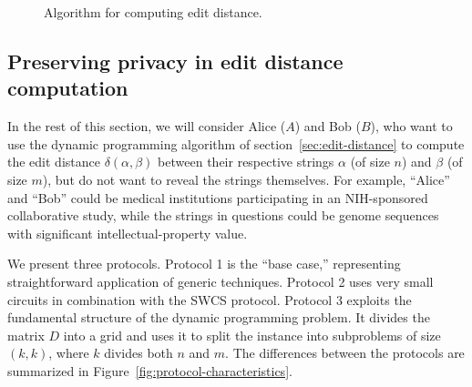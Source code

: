 \begin{figure}
\caption{Algorithm for computing edit distance.}
\label{fig:edit-distance-alg}
\end{figure}


\subsection{Preserving privacy in edit distance computation}

In the rest of this section, we will consider Alice ($A$) and
Bob ($B$), who want to use the dynamic programming algorithm
of section~\ref{sec:edit-distance} to compute the edit distance
$\delta(\alpha,\beta)$ between their respective strings $\alpha$
(of size $n$) and $\beta$ (of size $m$), but do not want to reveal
the strings themselves.  For example, ``Alice'' and ``Bob'' could be
medical institutions participating in an NIH-sponsored collaborative
study, while the strings in questions could be genome sequences with
significant intellectual-property value.

We present three protocols.  Protocol 1 is the ``base case,'' representing
straightforward application of generic techniques.  Protocol 2 uses
very small circuits in combination with the SWCS protocol.  Protocol 3
exploits the fundamental structure of the dynamic programming problem.
It divides the matrix $D$ into a grid and uses it to split the
instance into subproblems of size $(k,k)$, where $k$ divides both $n$
and $m$.  The differences between the protocols are summarized in
Figure~\ref{fig:protocol-characteristics}.


